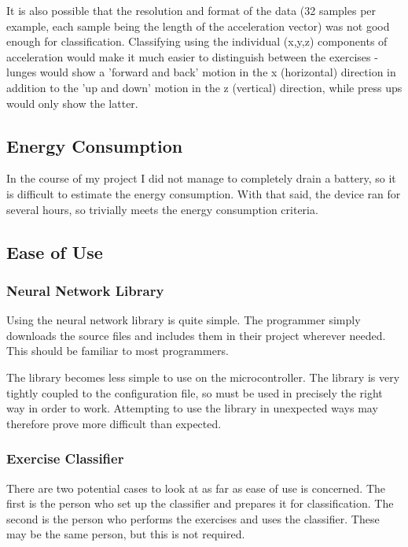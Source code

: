 \documentclass[a4paper]{article}
\begin{document}
It is also possible that the resolution and format of the data (32 samples per example, each sample being the length of the acceleration vector) was not good enough for classification. Classifying using the individual (x,y,z) components of acceleration would make it much easier to distinguish between the exercises - lunges would show a 'forward and back' motion in the x (horizontal) direction in addition to the 'up and down' motion in the z (vertical) direction, while press ups would only show the latter. 

\subsection{Energy Consumption}%
\label{subsec:ev_energyconsumption}

In the course of my project I did not manage to completely drain a battery, so it is difficult to estimate the energy consumption. With that said, the device ran for several hours, so trivially meets the energy consumption criteria.

\subsection{Ease of Use}%
\label{subsec:ev_eu}

\subsubsection{Neural Network Library}

Using the neural network library is quite simple. The programmer simply downloads the source files and includes them in their project wherever needed. This should be familiar to most programmers.

The library becomes less simple to use on the microcontroller. The library is very tightly coupled to the configuration file, so must be used in precisely the right way in order to work. Attempting to use the library in unexpected ways may therefore prove more difficult than expected.

\subsubsection{Exercise Classifier}

There are two potential cases to look at as far as ease of use is concerned. The first is the person who set up the classifier and prepares it for classification. The second is the person who performs the exercises and uses the classifier. These may be the same person, but this is not required.
\end{document}
